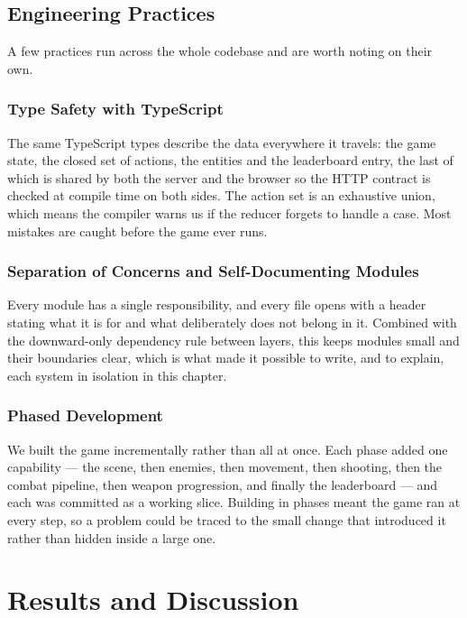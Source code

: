 \documentclass[12pt,a4paper]{report}
\begin{document}
\section{Engineering Practices}

A few practices run across the whole codebase and are worth noting on their own.

\subsection{Type Safety with TypeScript}

The same TypeScript types describe the data everywhere it travels: the game
state, the closed set of actions, the entities and the leaderboard entry, the
last of which is shared by both the server and the browser so the HTTP contract
is checked at compile time on both sides. The action set is an exhaustive union,
which means the compiler warns us if the reducer forgets to handle a case. Most
mistakes are caught before the game ever runs.

\subsection{Separation of Concerns and Self-Documenting Modules}

Every module has a single responsibility, and every file opens with a header
stating what it is for and what deliberately does not belong in it. Combined with
the downward-only dependency rule between layers, this keeps modules small and
their boundaries clear, which is what made it possible to write, and to explain,
each system in isolation in this chapter.

\subsection{ Phased Development}

We built the game incrementally rather than all at once. Each phase added one
capability --- the scene, then enemies, then movement, then shooting, then the
combat pipeline, then weapon progression, and finally the leaderboard --- and
each was committed as a working slice. Building in phases meant the game ran at
every step, so a problem could be traced to the small change that introduced it
rather than hidden inside a large one.

\chapter{Results and Discussion}\label{ch:results}
\end{document}
